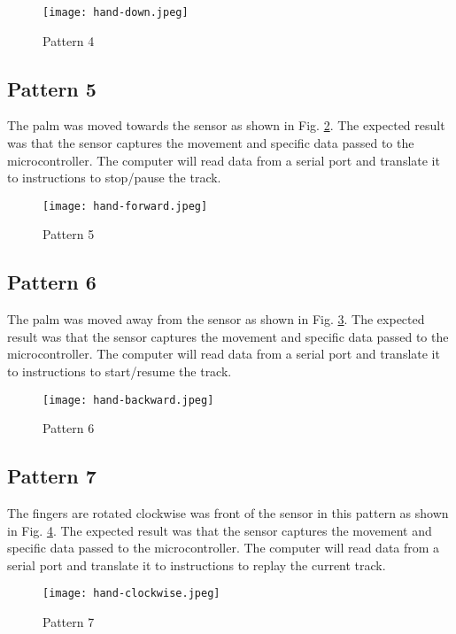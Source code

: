 \documentclass[conference,a4paper]{IEEEtran}
\begin{document}
\begin{figure}[!h]
    \centering
    \texttt{[image: hand-down.jpeg]}
    \caption{Pattern 4}
    \label{fig:pattern-4}
\end{figure}

\subsection{Pattern 5}
The palm was moved towards the sensor as shown in Fig. \ref{fig:pattern-5}. The expected result was that the sensor captures the movement and specific data passed to the microcontroller. The computer will read data from a serial port and translate it to instructions to stop/pause the track.

\begin{figure}[!h]
    \centering
    \texttt{[image: hand-forward.jpeg]}
    \caption{Pattern 5}
    \label{fig:pattern-5}
\end{figure}

\subsection{Pattern 6}
The palm was moved away from the sensor as shown in Fig. \ref{fig:pattern-6}. The expected result was that the sensor captures the movement and specific data passed to the microcontroller. The computer will read data from a serial port and translate it to instructions to start/resume the track.

\begin{figure}[!h]
    \centering
    \texttt{[image: hand-backward.jpeg]}
    \caption{Pattern 6}
    \label{fig:pattern-6}
\end{figure}

\subsection{Pattern 7}
The fingers are rotated clockwise was front of the sensor in this pattern  as shown in Fig. \ref{fig:pattern-7}. The expected result was that the sensor captures the movement and specific data passed to the microcontroller. The computer will read data from a serial port and translate it to instructions to replay the current track.

\begin{figure}[!h]
    \centering
    \texttt{[image: hand-clockwise.jpeg]}
    \caption{Pattern 7}
    \label{fig:pattern-7}
\end{figure}
\end{document}
